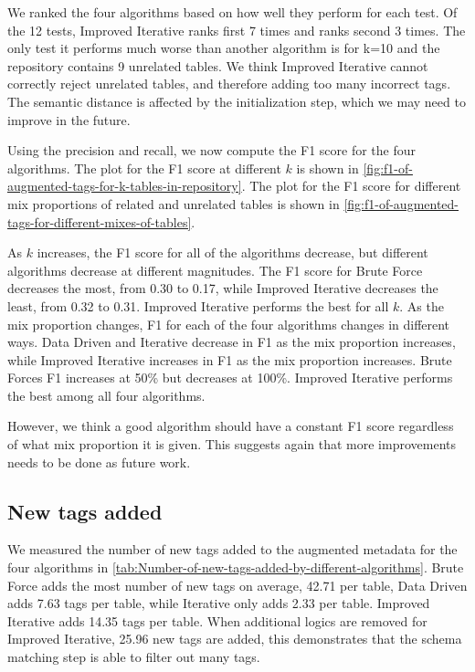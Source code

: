We ranked the four algorithms based on how well they perform for each test. Of the 12 tests, Improved Iterative ranks first 7 times and ranks second 3 times. The only test it performs much worse than another algorithm is for k=10 and the repository contains 9 unrelated tables. We think Improved Iterative cannot correctly reject unrelated tables, and therefore adding too many incorrect tags. The semantic distance is affected by the initialization step, which we may need to improve in the future.

Using the precision and recall, we now compute the F1 score for the four algorithms. The plot for the F1 score at different $k$ is shown in \autoref{fig:f1-of-augmented-tags-for-k-tables-in-repository}. The plot for the F1 score for different mix proportions of related and unrelated tables is shown in \autoref{fig:f1-of-augmented-tags-for-different-mixes-of-tables}.

As $k$ increases, the F1 score for all of the algorithms decrease, but different algorithms decrease at different magnitudes. The F1 score for Brute Force decreases the most, from 0.30 to 0.17, while Improved Iterative decreases the least, from 0.32 to 0.31. Improved Iterative performs the best for all $k$. As the mix proportion changes, F1 for each of the four algorithms changes in different ways. Data Driven and Iterative decrease in F1 as the mix proportion increases, while Improved Iterative increases in F1 as the mix proportion increases. Brute Forces F1 increases at 50\% but decreases at 100\%. Improved Iterative performs the best among all four algorithms.

However, we think a good algorithm should have a constant F1 score regardless of what mix proportion it is given. This suggests again that more improvements needs to be done as future work.

\subsection{New tags added}

We measured the number of new tags added to the augmented metadata for the four algorithms in \autoref{tab:Number-of-new-tags-added-by-different-algorithms}. Brute Force adds the most number of new tags on average, 42.71 per table, Data Driven adds 7.63 tags per table, while Iterative only adds 2.33 per table. Improved Iterative adds 14.35 tags per table. When additional logics are removed for Improved Iterative, 25.96 new tags are added, this demonstrates that the schema matching step is able to filter out many tags.

